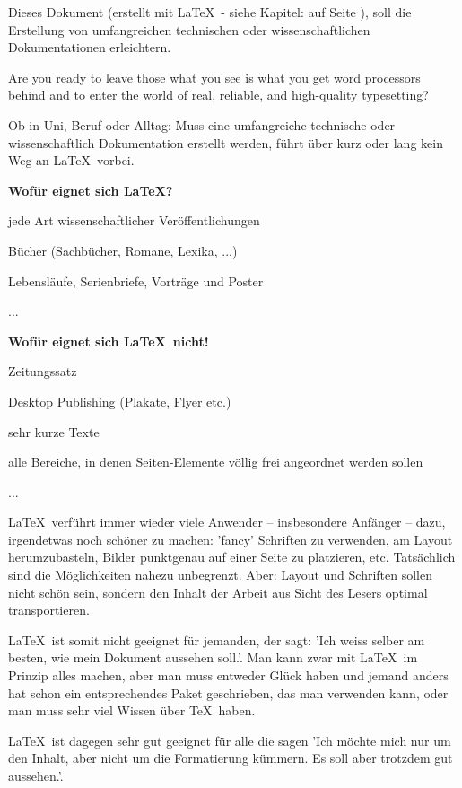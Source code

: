 Dieses Dokument (erstellt mit \LaTeX\ - siehe Kapitel:   auf Seite \pageref{Installation}), soll die Erstellung von umfangreichen technischen oder wissenschaftlichen Dokumentationen erleichtern.

\begin{tcolorbox}
Are you ready to leave those \dq what you see is what you get\dq{} word processors behind and to enter the world of real, reliable, and high-quality typesetting\cite{Kottwitz2011}?
\end{tcolorbox}

Ob in Uni, Beruf oder Alltag: Muss eine umfangreiche technische oder wissenschaftlich Dokumentation erstellt werden, führt über kurz oder lang kein Weg an \LaTeX\ vorbei.\par  

\textbf{Wofür eignet sich \LaTeX?}
\begin{compactitem}
\item jede Art wissenschaftlicher Veröffentlichungen 
\item Bücher (Sachbücher, Romane, Lexika, ...) 
\item Lebensläufe, Serienbriefe, Vorträge und Poster 
\item  ... 
\end{compactitem}
\par 

\textbf{Wofür eignet sich \LaTeX\ nicht!}
\begin{compactitem} 
\item Zeitungssatz  
\item Desktop Publishing (Plakate, Flyer etc.)  
\item sehr kurze Texte  
\item alle Bereiche, in denen Seiten-Elemente völlig frei angeordnet werden sollen
\item  ... 
\end{compactitem}
\par 

\LaTeX\ verführt immer wieder viele Anwender – insbesondere Anfänger – dazu, irgendetwas noch schöner zu machen: 'fancy' Schriften zu verwenden, am Layout herumzubasteln, Bilder punktgenau auf einer Seite zu platzieren, etc. Tatsächlich sind die Möglichkeiten nahezu unbegrenzt. Aber: Layout und Schriften sollen nicht schön sein, sondern den Inhalt der Arbeit aus Sicht des Lesers optimal transportieren.\par

\LaTeX\ ist somit nicht geeignet für jemanden, der sagt: 'Ich weiss selber am besten, wie mein Dokument aussehen soll.'. Man kann zwar mit \LaTeX\  im Prinzip alles machen, aber man muss entweder Glück haben und jemand anders hat schon ein entsprechendes Paket geschrieben, das man verwenden kann, oder man muss sehr viel Wissen über \TeX\ haben.\par

\LaTeX\ ist dagegen sehr gut geeignet für alle die sagen 'Ich möchte mich nur um den Inhalt, aber nicht um die Formatierung kümmern. Es soll aber trotzdem gut aussehen.'.\par 
